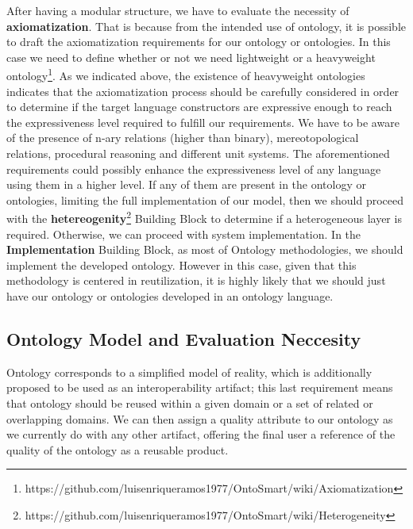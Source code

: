 After having a modular structure, we have to evaluate the necessity of \textbf{axiomatization}. That is because from the intended use of ontology, it is possible to draft the axiomatization requirements for our ontology or ontologies. In this case we need to define whether or not we need lightweight or a heavyweight ontology\footnote{https://github.com/luisenriqueramos1977/OntoSmart/wiki/Axiomatization}. As we indicated above, the existence of heavyweight ontologies indicates that the axiomatization process should be carefully considered in order to determine if the target language constructors are expressive enough to reach the expressiveness level required to fulfill our requirements. We have to be aware of the presence of n-ary relations (higher than binary), mereotopological relations, procedural reasoning and different unit systems. The  aforementioned  requirements  could possibly  enhance the expressiveness level of any language using them in a higher level. If any of them are present in the ontology or ontologies, limiting the full implementation of our model, then we should proceed with the \textbf{hetereogenity}\footnote{https://github.com/luisenriqueramos1977/OntoSmart/wiki/Heterogeneity} Building Block to determine if a heterogeneous layer is required. Otherwise, we can proceed with system implementation. In the \textbf{Implementation} Building Block, as most of Ontology methodologies, we should implement the developed ontology. However in this case, given that this methodology is centered in reutilization, it is highly likely that we should just have our ontology or ontologies developed in an ontology language. 









\subsection{Ontology Model and Evaluation Neccesity}\label{3.2.4}

Ontology corresponds to a simplified model of reality, which is additionally proposed to be used as an interoperability artifact; this last requirement means that ontology should be reused within  a given domain or a set of related or overlapping domains. We can then assign a quality attribute to our ontology as we currently do with any other artifact,  offering the final user a reference of the quality of the ontology as a reusable product. 

